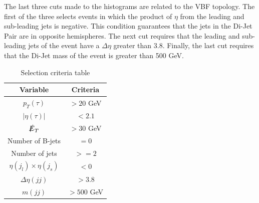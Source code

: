 The last three cuts made to the histograms are related to the VBF topology. The first of the three selects events in which the product of $\eta$ from the leading and sub-leading jets is negative. This condition guarantees that the jets in the Di-Jet Pair are in opposite hemispheres. The next cut requires that the leading and sub-leading jets of the event have a $\Delta \eta$ greater than 3.8. Finally, the last cut requires that the Di-Jet mass of the event is greater than 500 GeV.

\begin{table}
\centering
\begin{tabular}{|c|c|}
\hline
Variable & Criteria \\
\hline
$p_{T}(\tau)$ & $> 20$ GeV \\
$|\eta(\tau)|$ & $< 2.1$ \\ 
$\slashed{E}_{T}$ & $> 30$ GeV \\
Number of B-jets & $= 0$ \\
Number of jets & $ >= 2$ \\
$\eta(j_{l}) \times \eta(j_{s})$ & $<0$ \\
$\Delta \eta(jj)$ & $ > 3.8$ \\
$m(jj)$ & $> 500$ GeV \\
\hline
\end{tabular}
\caption{Selection criteria table}
\label{table: cuts}
\end{table}
